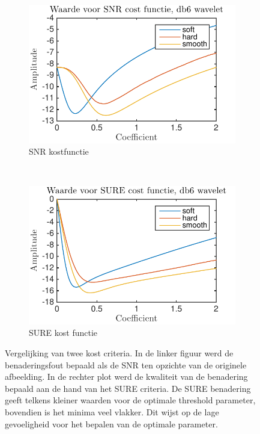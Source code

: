 \begin{figure}
    \centering
    \begin{subfigure}[b]{0.4\textwidth}
        \includegraphics[width=\textwidth]{../src/denoising/sure/SURE_cost_snr}
        \caption{SNR kostfunctie}
        \label{fig:roster_denoising}
    \end{subfigure}
    ~ %
    \begin{subfigure}[b]{0.4\textwidth}
        \includegraphics[width=\textwidth]{../src/denoising/sure/SURE_cost}
        \caption{SURE kost functie}
        \label{fig:kost_crit_b}
    \end{subfigure}
    \caption{Vergelijking van twee kost criteria. In de linker figuur werd de benaderingsfout bepaald als de SNR ten opzichte van de originele afbeelding. In de rechter plot werd de kwaliteit van de benadering bepaald aan de hand van het SURE criteria. De SURE benadering geeft telkens kleiner waarden voor de optimale threshold parameter, bovendien is het minima veel vlakker. Dit wijst op de lage gevoeligheid voor het bepalen van de optimale parameter.}\label{fig:kost_crit}
\end{figure}



